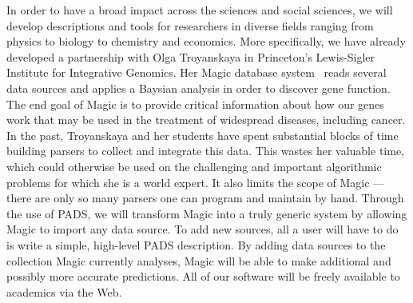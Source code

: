 \documentclass[11pt]{article}
\begin{document}
In order to have a broad impact across the sciences and social sciences,
we will develop descriptions and tools for researchers in diverse fields ranging from
physics to biology to chemistry and economics.
More specifically, we have already developed a partnership with
Olga Troyanskaya in Princeton's Lewis-Sigler Institute for 
Integrative Genomics.  Her Magic database system~\cite{magic}
reads several data sources
and applies a Baysian analysis in order to discover gene function.
The end goal of Magic is to provide critical information about how
our genes work that may be used in the treatment of widespread diseases,
including cancer.
In the past, Troyanskaya and her students have spent
substantial blocks of time building parsers to collect and integrate
this data.  This wastes her valuable time, which could otherwise be
used on the challenging and important algorithmic problems for which
she is a world expert.  It also limits the scope of Magic --- there are
only so many parsers one can program and maintain by hand.
Through the use of PADS, we will transform Magic into a truly generic
system by allowing Magic to import any data source.  To add new sources,
all a user will have to do is write a simple, high-level PADS description.
By adding data sources to the collection Magic
currently analyses, Magic will be able to make additional and possibly more
accurate predictions.  All of our software will
be freely available to academics via the Web.


\end{document}
